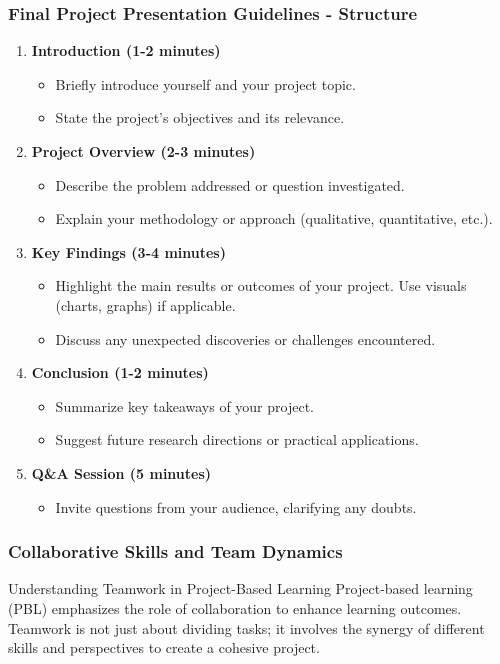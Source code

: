 \documentclass[aspectratio=169]{beamer}
\begin{document}
\begin{frame}[fragile]
    \frametitle{Final Project Presentation Guidelines - Structure}
    \begin{enumerate}
        \item \textbf{Introduction (1-2 minutes)}
            \begin{itemize}
                \item Briefly introduce yourself and your project topic.
                \item State the project's objectives and its relevance.
            \end{itemize}
        \item \textbf{Project Overview (2-3 minutes)}
            \begin{itemize}
                \item Describe the problem addressed or question investigated.
                \item Explain your methodology or approach (qualitative, quantitative, etc.).
            \end{itemize}
        \item \textbf{Key Findings (3-4 minutes)}
            \begin{itemize}
                \item Highlight the main results or outcomes of your project. Use visuals (charts, graphs) if applicable.
                \item Discuss any unexpected discoveries or challenges encountered.
            \end{itemize}
        \item \textbf{Conclusion (1-2 minutes)}
            \begin{itemize}
                \item Summarize key takeaways of your project.
                \item Suggest future research directions or practical applications.
            \end{itemize}
        \item \textbf{Q\&A Session (5 minutes)}
            \begin{itemize}
                \item Invite questions from your audience, clarifying any doubts.
            \end{itemize}
    \end{enumerate}
\end{frame}

\begin{frame}[fragile]
    \frametitle{Collaborative Skills and Team Dynamics}
    \begin{block}{Understanding Teamwork in Project-Based Learning}
        Project-based learning (PBL) emphasizes the role of collaboration to enhance learning outcomes. 
        Teamwork is not just about dividing tasks; it involves the synergy of different skills and perspectives to create a cohesive project.
    \end{block}
\end{frame}
\end{document}
